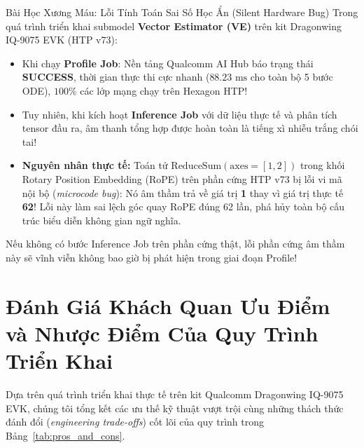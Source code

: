 \documentclass[11pt,a4paper,oneside,table]{report}
\begin{document}
\begin{technicalbox}{Bài Học Xương Máu: Lỗi Tính Toán Sai Số Học Ẩn (Silent Hardware Bug)}
Trong quá trình triển khai submodel \textbf{Vector Estimator (VE)} trên kit Dragonwing IQ-9075 EVK (HTP v73):
\begin{itemize}
    \item Khi chạy \textbf{Profile Job}: Nền tảng Qualcomm AI Hub báo trạng thái \textbf{SUCCESS}, thời gian thực thi cực nhanh ($88.23\text{ ms}$ cho toàn bộ 5 bước ODE), $100\%$ các lớp mạng chạy trên Hexagon HTP!
    \item Tuy nhiên, khi kích hoạt \textbf{Inference Job} với dữ liệu thực tế và phân tích tensor đầu ra, âm thanh tổng hợp được hoàn toàn là tiếng xì nhiễu trắng chói tai!
    \item \textbf{Nguyên nhân thực tế:} Toán tử $\text{ReduceSum}(\text{axes}=[1,2])$ trong khối Rotary Position Embedding (RoPE) trên phần cứng HTP v73 bị lỗi vi mã nội bộ (\textit{microcode bug}): Nó âm thầm trả về giá trị \textbf{1} thay vì giá trị thực tế \textbf{62}! Lỗi này làm sai lệch góc quay RoPE đúng 62 lần, phá hủy toàn bộ cấu trúc biểu diễn không gian ngữ nghĩa.
\end{itemize}
Nếu không có bước Inference Job trên phần cứng thật, lỗi phần cứng âm thầm này sẽ vĩnh viễn không bao giờ bị phát hiện trong giai đoạn Profile!
\end{technicalbox}

\section{Đánh Giá Khách Quan Ưu Điểm và Nhược Điểm Của Quy Trình Triển Khai}
\label{sec:pros_cons_evaluation}

Dựa trên quá trình triển khai thực tế trên kit Qualcomm Dragonwing IQ-9075 EVK, chúng tôi tổng kết các ưu thế kỹ thuật vượt trội cùng những thách thức đánh đổi (\textit{engineering trade-offs}) cốt lõi của quy trình trong Bảng~\ref{tab:pros_and_cons}.
\end{document}
